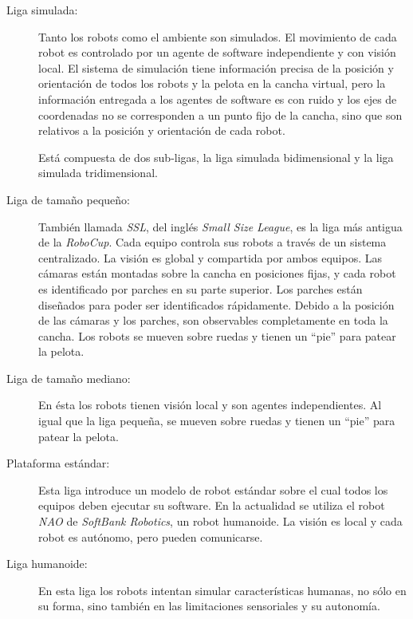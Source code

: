 \begin{description}

	\item[Liga simulada:] Tanto los robots como el ambiente son simulados.
		El movimiento de cada robot es controlado por un agente de
		software independiente y con visión local. El sistema de
		simulación tiene información precisa de la posición y
		orientación de todos los robots y la pelota en la cancha
		virtual, pero la información entregada a los agentes de software
		es con ruido y los ejes de coordenadas no se corresponden a un
		punto fijo de la cancha, sino que son relativos a la posición y
		orientación de cada robot.

		Está compuesta de dos sub-ligas, la liga simulada
		bidimensional y la liga simulada tridimensional.

	\item[Liga de tamaño pequeño:] También llamada \emph{SSL}, del inglés
		\emph{Small Size League}, es la liga más antigua de la
		\emph{RoboCup}. Cada equipo controla sus robots a través de un
		sistema centralizado. La visión es global y compartida por ambos
		equipos. Las cámaras están montadas sobre la cancha en
		posiciones fijas, y cada robot es identificado por parches en su
		parte superior. Los parches están diseñados para poder ser
		identificados rápidamente. Debido a la posición de las cámaras y
		los parches, son observables completamente en toda la cancha.
		Los robots se mueven sobre ruedas y tienen un ``pie'' para
		patear la pelota.

	\item[Liga de tamaño mediano:] En ésta los robots tienen visión local
		y son agentes independientes. Al igual que la liga pequeña, se
		mueven sobre ruedas y tienen un ``pie'' para patear la pelota.

	\item[Plataforma estándar:] Esta liga introduce un modelo de robot
		estándar sobre el cual todos los equipos deben ejecutar su
		software. En la actualidad se utiliza el robot \emph{NAO} de
		\emph{SoftBank Robotics}, un robot humanoide.  La visión es
		local y cada robot es autónomo, pero pueden comunicarse.

	\item[Liga humanoide:] En esta liga los robots intentan simular
		características humanas, no sólo en su forma, sino también en
		las limitaciones sensoriales y su autonomía.

\end{description}

